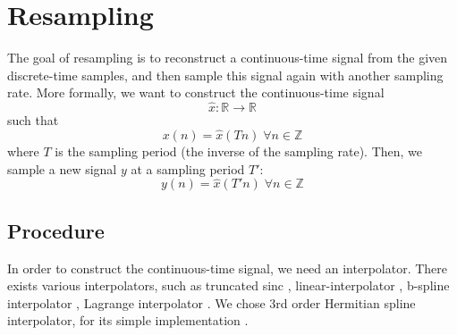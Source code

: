 \documentclass[letterpaper]{article}
\theoremstyle{definition}
\theoremstyle{remark}
\theoremstyle{plain}
\begin{document}
\section{Resampling}
The goal of resampling is to reconstruct a continuous-time signal from the given
discrete-time samples, and then sample this signal again with another sampling
rate. More formally, we want to construct the continuous-time signal
\begin{equation}\hat x:\mathbb{R}\to\mathbb{R}\end{equation}
such that
\begin{equation}x(n) = \hat x(Tn) \;\forall n\in\mathbb{Z}\end{equation}
where \(T\) is the sampling period (the inverse of the sampling rate). Then, we
sample a new signal \(y\) at a sampling period \(T'\):
\begin{equation*}y(n) = \hat x(T'n) \;\forall n\in\mathbb{Z}\end{equation*}

\subsection{Procedure}
In order to construct the continuous-time signal, we need an interpolator. There
exists various interpolators, such as truncated sinc
\citep{duncan1988fundamentals, rossum1989an}, linear-interpolator
\citep{rossum1993}, b-spline interpolator \citep{Sankar1998},
Lagrange interpolator \citep{Schafer1973}. We chose 3rd order Hermitian spline
interpolator, for its simple implementation \citep{Grisoni97anhermitian}.
\end{document}
